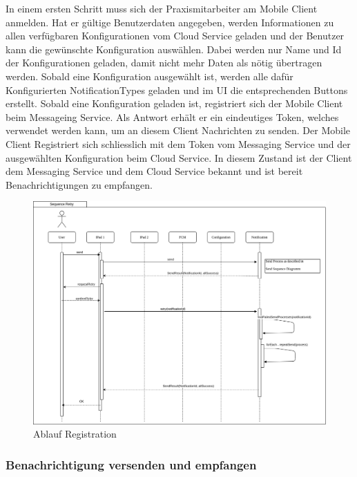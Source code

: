 In einem ersten Schritt muss sich der Praxismitarbeiter am Mobile Client anmelden.
Hat er gültige Benutzerdaten angegeben, werden Informationen zu allen verfügbaren Konfigurationen vom Cloud Service geladen und der Benutzer kann die gewünschte Konfiguration auswählen.
Dabei werden nur Name und Id der Konfigurationen geladen, damit nicht mehr Daten als nötig übertragen werden.
Sobald eine Konfiguration ausgewählt ist, werden alle dafür Konfigurierten NotificationTypes geladen und im UI die entsprechenden Buttons erstellt.
Sobald eine Konfiguration geladen ist, registriert sich der Mobile Client beim Messageing Service.
Als Antwort erhält er ein eindeutiges Token, welches verwendet werden kann, um an diesem Client Nachrichten zu senden.
Der Mobile Client Registriert sich schliesslich mit dem Token vom Messaging Service und der ausgewählten Konfiguration beim Cloud Service.
In diesem Zustand ist der Client dem Messaging Service und dem Cloud Service bekannt und ist bereit Benachrichtigungen zu empfangen.

\begin{figure}[h]
    \centering
    \begin{minipage}[b]{1.0\textwidth}
        \includegraphics[width=\textwidth]{graphics/Sequence_Notification_Register}
        \caption{Ablauf Registration}
    \end{minipage}
\end{figure}


\subsubsection*{Benachrichtigung versenden und empfangen}

